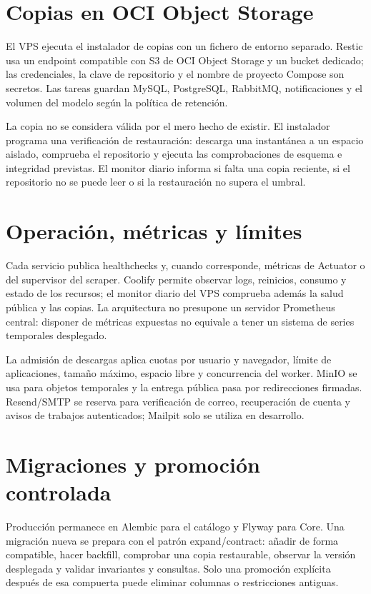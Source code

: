 \section{Copias en OCI Object Storage}

El VPS ejecuta el instalador de copias con un fichero de entorno separado. Restic usa un endpoint compatible con S3 de OCI Object Storage y un bucket dedicado; las credenciales, la clave de repositorio y el nombre de proyecto Compose son secretos. Las tareas guardan MySQL, PostgreSQL, RabbitMQ, notificaciones y el volumen del modelo según la política de retención.

La copia no se considera válida por el mero hecho de existir. El instalador programa una verificación de restauración: descarga una instantánea a un espacio aislado, comprueba el repositorio y ejecuta las comprobaciones de esquema e integridad previstas. El monitor diario informa si falta una copia reciente, si el repositorio no se puede leer o si la restauración no supera el umbral.

\section{Operación, métricas y límites}

Cada servicio publica healthchecks y, cuando corresponde, métricas de Actuator o del supervisor del scraper. Coolify permite observar logs, reinicios, consumo y estado de los recursos; el monitor diario del VPS comprueba además la salud pública y las copias. La arquitectura no presupone un servidor Prometheus central: disponer de métricas expuestas no equivale a tener un sistema de series temporales desplegado.

La admisión de descargas aplica cuotas por usuario y navegador, límite de aplicaciones, tamaño máximo, espacio libre y concurrencia del worker. MinIO se usa para objetos temporales y la entrega pública pasa por redirecciones firmadas. Resend/SMTP se reserva para verificación de correo, recuperación de cuenta y avisos de trabajos autenticados; Mailpit solo se utiliza en desarrollo.

\section{Migraciones y promoción controlada}

Producción permanece en Alembic  para el catálogo y Flyway  para Core. Una migración nueva se prepara con el patrón expand/contract: añadir de forma compatible, hacer backfill, comprobar una copia restaurable, observar la versión desplegada y validar invariantes y consultas. Solo una promoción explícita después de esa compuerta puede eliminar columnas o restricciones antiguas.

